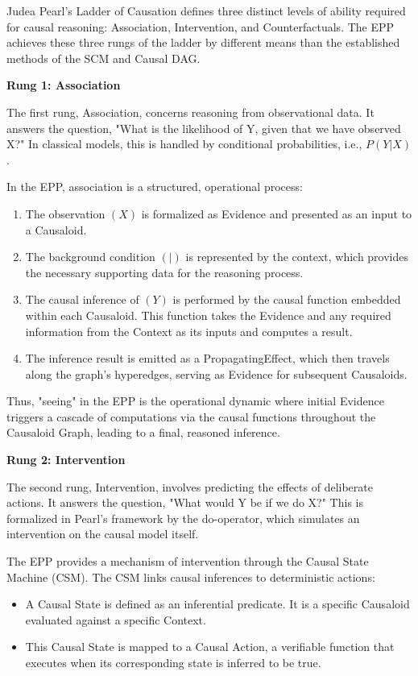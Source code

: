Judea Pearl's Ladder of Causation\cite{pearl2000causality} defines three distinct levels of ability required for causal reasoning: Association, Intervention, and Counterfactuals. The EPP achieves these three rungs of the ladder by different means than the established methods of the SCM and Causal DAG.  

\textbf{Rung 1: Association}

The first rung, Association, concerns reasoning from observational data. 
It answers the question, "What is the likelihood of Y, given that we have observed X?" In classical models, this is handled by conditional probabilities, i.e., $P(Y|X)$.

In the EPP, association is a structured, operational process:

\begin{enumerate}
	\item The observation $(X)$ is formalized as Evidence and presented as an input to a Causaloid.
	\item The background condition $(|)$ is represented by the context, which provides the necessary supporting data for the reasoning process.
	\item The causal inference of $(Y)$ is performed by the causal function embedded within each Causaloid. This function takes the Evidence and any required information from the Context as its inputs and computes a result.
	\item The inference result is emitted as a PropagatingEffect, which then travels along the graph's hyperedges, serving as Evidence for subsequent Causaloids.
\end{enumerate}

Thus, "seeing" in the EPP is the operational dynamic where initial Evidence triggers a cascade of computations via the causal functions throughout the Causaloid Graph, leading to a final, reasoned inference.

\textbf{Rung 2: Intervention}

The second rung, Intervention, involves predicting the effects of deliberate actions. It answers the question, "What would Y be if we do X?" This is formalized in Pearl's framework by the do-operator, which simulates an intervention on the causal model itself.

The EPP provides a mechanism of intervention through the Causal State Machine (CSM). 
The CSM  links causal inferences to deterministic actions:

\begin{itemize}
	\item A Causal State is defined as an inferential predicate. It is a specific Causaloid evaluated against a specific Context.
	\item This Causal State is mapped to a Causal Action, a verifiable function that executes when its corresponding state is inferred to be true.

\end{itemize}

